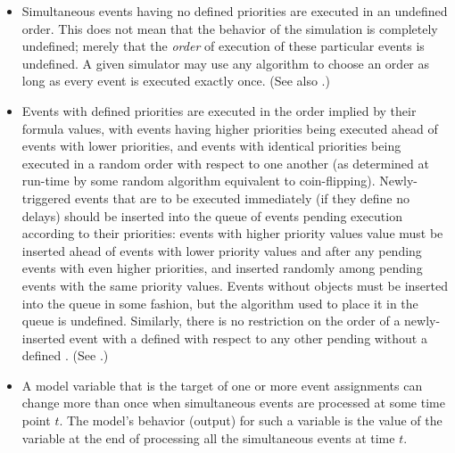 \begin{itemize}
\item Simultaneous events having no defined priorities are
  executed in an undefined order.  This does not mean that the
  behavior of the simulation is completely undefined; merely that
  the \emph{order} of execution of these particular events is
  undefined.  A given simulator may use any algorithm to choose an
  order as long as every event is executed exactly once.  (See
  also .)

\item Events with defined priorities are executed in the order
  implied by their \Priority {} formula values, with
  events having higher priorities being executed ahead of events
  with lower priorities, and events with identical priorities
  being executed in a random order with respect to one another (as
  determined at run-time by some random algorithm equivalent to
  coin-flipping).  Newly-triggered events that are to be executed
  immediately (\ie if they define no delays) should be inserted
  into the queue of events pending execution according to their
  priorities: events with higher priority values value must be
  inserted ahead of events with lower priority values and after
  any pending events with even higher priorities, and inserted
  randomly among pending events with the same priority values.
  Events without \Priority objects must be inserted into the queue
  in some fashion, but the algorithm used to place it in the queue
  is undefined.  Similarly, there is no restriction on the order
  of a newly-inserted event with a defined \Priority with respect
  to any other pending \Event without a defined \Priority.  (See
  .)

% 

\item A model variable that is the target of one or more event
  assignments can change more than once when simultaneous events
  are processed at some time point $t$.  The model's behavior
  (output) for such a variable is the value of the variable at the
  end of processing all the simultaneous events at time $t$.

\end{itemize}


